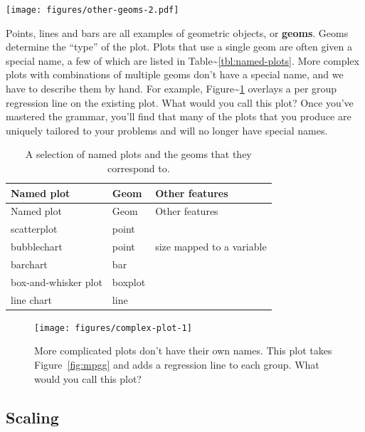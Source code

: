 \texttt{[image: figures/other-geoms-2.pdf]}

Points, lines and bars are all examples of geometric objects, or
\textbf{geoms}. Geoms determine the ``type'' of the plot. Plots that use
a single geom are often given a special name, a few of which are listed
in Table\textasciitilde{}\ref{tbl:named-plots}. More complex plots with
combinations of multiple geoms don't have a special name, and we have to
describe them by hand. For example,
Figure\textasciitilde{}\ref{fig:complex-plot} overlays a per group
regression line on the existing plot. What would you call this plot?
Once you've mastered the grammar, you'll find that many of the plots
that you produce are uniquely tailored to your problems and will no
longer have special names. 

\begin{longtable}[c]{@{}lll@{}}
\caption{A selection of named plots and the geoms that they correspond
to.}\tabularnewline
\toprule
Named plot & Geom & Other features\tabularnewline
\midrule
\endfirsthead
\toprule
Named plot & Geom & Other features\tabularnewline
\midrule
\endhead
scatterplot & point &\tabularnewline
bubblechart & point & size mapped to a variable\tabularnewline
barchart & bar &\tabularnewline
box-and-whisker plot & boxplot &\tabularnewline
line chart & line &\tabularnewline
\bottomrule
\end{longtable}

\begin{Shaded}
\begin{Highlighting}[]
  \StringTok{ }
\StringTok{  }\NormalTok{(} \StringTok{ }\NormalTok{), } \NormalTok{)}
\end{Highlighting}
\end{Shaded}

\begin{figure}
\texttt{[image: figures/complex-plot-1]} \caption{More complicated plots don't have their own names. This plot takes Figure~\ref{fig:mpgg} and adds a regression line to each group. What would you call this plot?\label{fig:complex-plot}}
\end{figure}

\subsection{Scaling}

